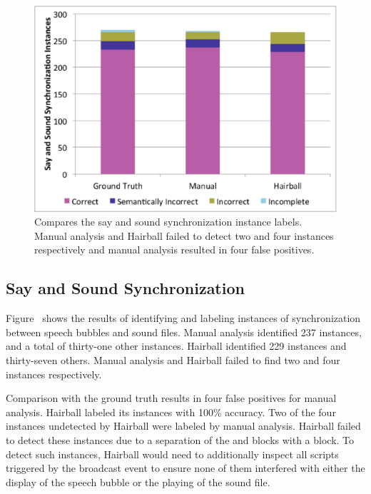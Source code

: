 \begin{figure}[!t]
\centering
\includegraphics[trim=.3in .15in .3in .15in, clip,
  width=5.25in]{graphs/AutoSaySoundSync.eps}
\caption{Compares the say and sound synchronization instance labels. Manual
  analysis and Hairball failed to detect two and four instances respectively
  and manual analysis resulted in four false positives.}
\end{figure}

\subsection{Say and Sound Synchronization}
Figure~ shows the results of identifying and
labeling instances of synchronization between speech bubbles and sound
files. Manual analysis identified 237 \correct{} instances, and a total of
thirty-one other instances. Hairball identified 229 \correct{} instances and
thirty-seven others. Manual analysis and Hairball failed to find two and four
instances respectively.

Comparison with the ground truth results in four false positives for manual
analysis. Hairball labeled its instances with 100\% accuracy. Two of the four
instances undetected by Hairball were labeled \incom{} by manual
analysis. Hairball failed to detect these instances due to a separation of the
\say{} and \playsound{} blocks with a \broadcast{} block. To detect such
instances, Hairball would need to additionally inspect all scripts triggered by
the broadcast event to ensure none of them interfered with either the display
of the speech bubble or the playing of the sound file.

